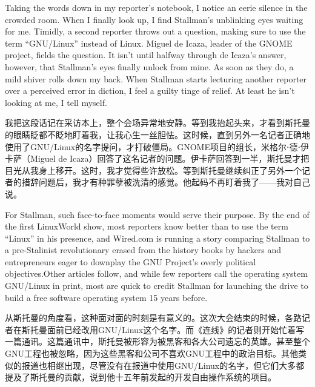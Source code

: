 \ifdefined\eng
Taking the words down in my reporter's notebook, I notice an eerie silence in the crowded room. When I finally look up, I find Stallman's unblinking eyes waiting for me. Timidly, a second reporter throws out a question, making sure to use the term ``GNU/Linux'' instead of Linux. Miguel de Icaza, leader of the GNOME project, fields the question. It isn't until halfway through de Icaza's answer, however, that Stallman's eyes finally unlock from mine. As soon as they do, a mild shiver rolls down my back. When Stallman starts lecturing another reporter over a perceived error in diction, I feel a guilty tinge of relief. At least he isn't looking at me, I tell myself.
\fi

\ifdefined\chs
我把这段话记在采访本上，整个会场异常地安静。等到我抬起头来，才看到斯托曼的眼睛眨都不眨地盯着我，让我心生一丝胆怯。这时候，直到另外一名记者正确地使用了GNU/Linux的名字提问，才打破僵局。GNOME项目的组长，米格尔⋅德⋅伊卡萨（Miguel de Icaza）回答了这名记者的问题。伊卡萨回答到一半，斯托曼才把目光从我身上移开。这时，我才觉得些许放松。等到斯托曼继续纠正了另外一个记者的措辞问题后，我才有种罪孽被洗清的感觉。他起码不再盯着我了——我对自己说。
\fi

\ifdefined\eng
For Stallman, such face-to-face moments would serve their purpose. By the end of the first LinuxWorld show, most reporters know better than to use the term ``Linux'' in his presence, and Wired.com is running a story comparing Stallman to a pre-Stalinist revolutionary erased from the history books by hackers and entrepreneurs eager to downplay the GNU Project's overly political objectives.\ifdefined\vtwo{}\fi  Other articles follow, and while few reporters call the operating system GNU/Linux in print, most are quick to credit Stallman for launching the drive to build a free software operating system 15 years before.
\fi

\ifdefined\chs
从斯托曼的角度看，这种面对面的时刻是有意义的。这次大会结束的时候，各路记者在斯托曼面前已经改用GNU/Linux这个名字。而《连线》的记者则开始忙着写一篇通讯。这篇通讯中，斯托曼被形容为被黑客和各大公司遗忘的英雄。甚至整个GNU工程也被忽略，因为这些黑客和公司不喜欢GNU工程中的政治目标\ifdefined\vtwo{}\fi 。其他类似的报道也相继出现，尽管没有在报道中使用GNU/Linux的名字，但它们大多都提及了斯托曼的贡献，说到他十五年前发起的开发自由操作系统的项目。
\fi

